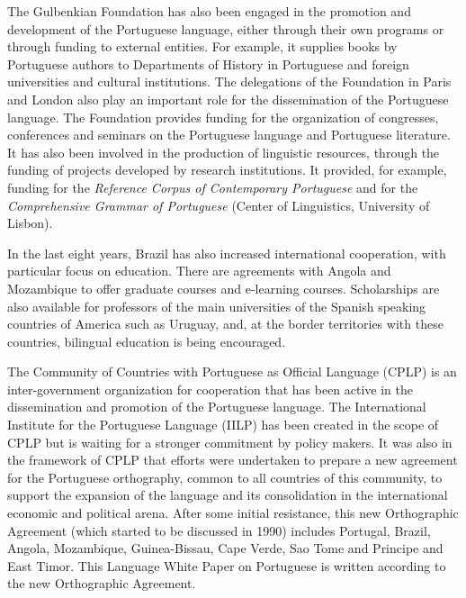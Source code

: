\begin{multicols}{2}

The Gulbenkian Foundation\cite{gulbenkian} has also been engaged in the promotion and development of the Portuguese language, either through their own programs or through funding to external entities. For example, it supplies books by Portuguese authors to Departments of History in Portuguese and foreign universities and cultural institutions. The delegations of the Foundation in Paris and London also play an important role for the dissemination of the Portuguese language. The Foundation provides funding for the organization of congresses, conferences and seminars on the Portuguese language and Portuguese literature. It has also been involved in the production of linguistic resources, through the funding of projects developed by research institutions. It provided, for example, funding for the \textit{Reference Corpus of Contemporary Portuguese} and for the \textit{Comprehensive Grammar of Portuguese} (Center of Linguistics, University of Lisbon).

In the last eight years, Brazil has also increased international cooperation, with particular focus on education. There are agreements with Angola and Mozambique to offer graduate courses and e-learning courses. Scholarships are also available for professors of the main universities of the Spanish speaking countries of America such as Uruguay, and, at the border territories with these countries, bilingual education is being encouraged.

The Community of Countries with Portuguese as Official Language (CPLP) is an inter-government organization for cooperation that has been active in the dissemination and promotion of the Portuguese language. The International Institute for the Portuguese Language (IILP) has been created in the scope of CPLP but is waiting for a stronger commitment by policy makers. It was also in the framework of CPLP that efforts were undertaken to prepare a new agreement for the Portuguese orthography\cite{pinto}, common to all countries of this community, to support the expansion of the language and its consolidation in the international economic and political arena. After some initial resistance, this new Orthographic Agreement (which started to be discussed in 1990) includes Portugal, Brazil, Angola, Mozambique, Guinea-Bissau, Cape Verde, Sao Tome and Principe and East Timor. This Language White Paper on Portuguese is written according to the new Orthographic Agreement.


\end{multicols}
